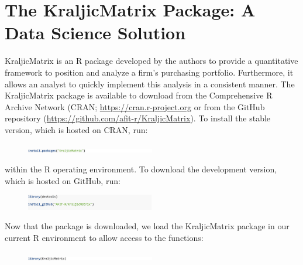 \documentclass[twocolumn]{svjour3}       %
\begin{document}
\section{The KraljicMatrix Package: A Data Science Solution}
\label{sec:4}

KraljicMatrix \citep{bmof17} is an R package developed by the authors to provide a quantitative framework to position and analyze a firm's purchasing portfolio. Furthermore, it allows an analyst to quickly implement this analysis in a consistent manner. The KraljicMatrix package is available to download from the Comprehensive R Archive Network (CRAN; \url{https://cran.r-project.org} or from the GitHub repository (\url{https://github.com/afit-r/KraljicMatrix}). To install the stable version, which is hosted on CRAN, run:
\begin{figure}[H]
  \includegraphics[width=0.5\textwidth]{code1.png}
\end{figure}
within the R operating environment. To download the development version, which is hosted on GitHub, run:
\begin{figure}[H]
  \includegraphics[width=0.5\textwidth]{code2.png}
\end{figure}
Now that the package is downloaded, we load the KraljicMatrix package in our current R environment to allow access to the functions:
\begin{figure}[H]
  \includegraphics[width=0.5\textwidth]{code3.png}
\end{figure}
\end{document}

